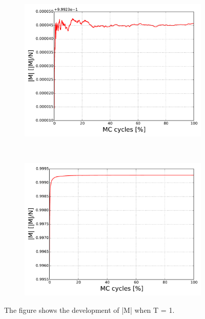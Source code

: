 \begin{figure}[H]
    \centering
    \begin{subfigure}{0.5\textwidth}
        \centering
        \includegraphics[width=\linewidth]{result/bilder/20x20/M-N20-T1}
        \caption{}
    \end{subfigure}%
    ~ 
    \begin{subfigure}{0.5\textwidth}
        \centering
        \includegraphics[width=\linewidth]{result/bilder/20x20/M-N20-T1-RNG}
        \caption{}
    \end{subfigure}
    \caption{The figure shows the development of |M| when T = 1. }
    \label{fig:}
\end{figure}






